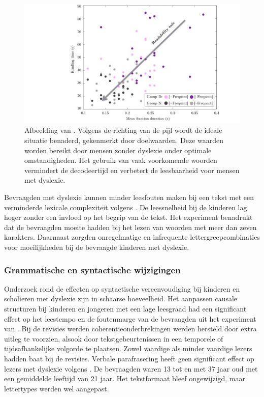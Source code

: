\begin{figure}
	\includegraphics[width=\linewidth]{img/readability-mean-fixation-duration.png}
	\caption{Afbeelding van \textcite{Rello2013a}. Volgens de richting van de pijl wordt de ideale situatie benaderd, gekenmerkt door doelwaarden. Deze waarden worden bereikt door mensen zonder dyslexie onder optimale omstandigheden. Het gebruik van vaak voorkomende woorden vermindert de decodeertijd en verbetert de leesbaarheid voor mensen met dyslexie.}
\end{figure}

Bevraagden met dyslexie kunnen minder leesfouten maken bij een tekst met een verminderde lexicale complexiteit volgens \textcite{Gala2016}. De leessnelheid bij de kinderen lag hoger zonder een invloed op het begrip van de tekst. Het experiment benadrukt dat de bevraagden moeite hadden bij het lezen van woorden met meer dan zeven karakters. Daarnaast zorgden onregelmatige en infrequente lettergreepcombinaties voor moeilijkheden bij de bevraagde kinderen met dyslexie.

\subsubsection{Grammatische en syntactische wijzigingen}

Onderzoek rond de effecten op syntactische vereenvoudiging bij kinderen en scholieren met dyslexie zijn in schaarse hoeveelheid. Het aanpassen causale structuren bij kinderen en jongeren met een lage leesgraad had een significant effect op het leestempo en de foutenmarge van de bevraagden uit het experiment van \textcite{Linderholm2000}. Bij de revisies werden coherentieonderbrekingen werden hersteld door extra uitleg te voorzien, alsook door tekstgebeurtenissen in een temporele of tijdsafhankelijke volgorde te plaatsen. Zowel vaardige als minder vaardige lezers hadden baat bij de revisies. Verbale parafrasering heeft geen significant effect op lezers met dyslexie volgens \textcite{Rello2013c}. De bevraagden waren 13 tot en met 37 jaar oud met een gemiddelde leeftijd van 21 jaar. Het tekstformaat bleef ongewijzigd, maar lettertypes werden wel aangepast. 

